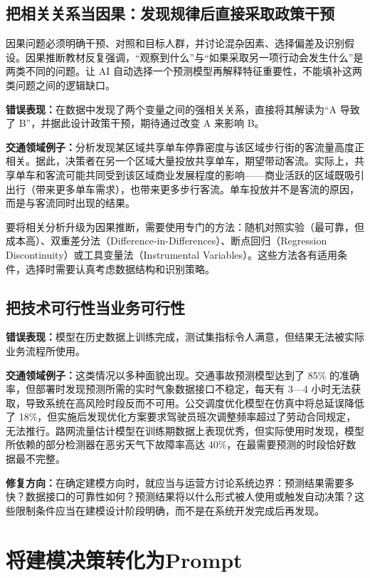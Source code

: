\subsection{把相关关系当因果：发现规律后直接采取政策干预}

因果问题必须明确干预、对照和目标人群，并讨论混杂因素、选择偏差及识别假设。因果推断教材反复强调，“观察到什么”与“如果采取另一项行动会发生什么”是两类不同的问题\cite{hernan2020causal}。让 AI 自动选择一个预测模型再解释特征重要性，不能填补这两类问题之间的逻辑缺口。

\textbf{错误表现：}在数据中发现了两个变量之间的强相关关系，直接将其解读为“A 导致了 B”，并据此设计政策干预，期待通过改变 A 来影响 B。

\textbf{交通领域例子：}分析发现某区域共享单车停靠密度与该区域步行街的客流量高度正相关。据此，决策者在另一个区域大量投放共享单车，期望带动客流。实际上，共享单车和客流可能共同受到该区域商业发展程度的影响——商业活跃的区域既吸引出行（带来更多单车需求），也带来更多步行客流。单车投放并不是客流的原因，而是与客流同时出现的结果。

要将相关分析升级为因果推断，需要使用专门的方法：随机对照实验（最可靠，但成本高）、双重差分法（Difference-in-Differences）、断点回归（Regression Discontinuity）或工具变量法（Instrumental Variables）。这些方法各有适用条件，选择时需要认真考虑数据结构和识别策略。

\subsection{把技术可行性当业务可行性}

\textbf{错误表现：}模型在历史数据上训练完成，测试集指标令人满意，但结果无法被实际业务流程所使用。

\textbf{交通领域例子：}这类情况以多种面貌出现。交通事故预测模型达到了 85\% 的准确率，但部署时发现预测所需的实时气象数据接口不稳定，每天有 3—4 小时无法获取，导致系统在高风险时段反而不可用。公交调度优化模型在仿真中将总延误降低了 18\%，但实施后发现优化方案要求驾驶员班次调整频率超过了劳动合同规定，无法推行。路网流量估计模型在训练期数据上表现优秀，但实际使用时发现，模型所依赖的部分检测器在恶劣天气下故障率高达 40\%，在最需要预测的时段恰好数据最不完整。

\textbf{修复方向：}在确定建模方向时，就应当与运营方讨论系统边界：预测结果需要多快？数据接口的可靠性如何？预测结果将以什么形式被人使用或触发自动决策？这些限制条件应当在建模设计阶段明确，而不是在系统开发完成后再发现。

\section{将建模决策转化为Prompt}

